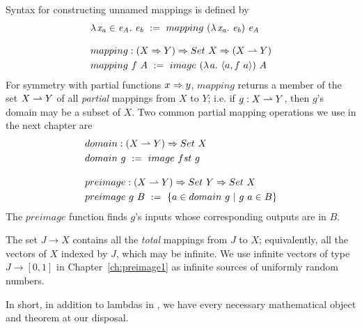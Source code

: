 Syntax for constructing unnamed mappings is defined by
\begin{align}
	&\fun{\mathit{x_a} \in \mathit{e_A}}{\mathit{e_b}} \ :=\ mapping~(\fun{\mathit{x_a}}\mathit{e_b})~\mathit{e_A} \\
\nonumber\\[-0.5\baselineskip]
	&\begin{aligned}
		&mapping : (X \tto Y) \tto Set~X \tto (X \pto Y) \\
		&mapping~f~A \ := \ image~(\fun{a}{\pair{a,f~a}})~A
	\end{aligned}
\end{align}
For symmetry with partial functions $x \Rightarrow y$, $mapping$ returns a member of the set $X \rightharpoonup Y$ of all \emph{partial} mappings from $X$ to $Y$; i.e. if $g : X \rightharpoonup Y$, then $g$'s domain may be a subset of $X$.
Two common partial mapping operations we use in the next chapter are
\begin{align}
	&\begin{aligned}
		&domain : (X \rightharpoonup Y) \Rightarrow Set~X \\
		&domain~g \ := \ image~fst~g
	\end{aligned} \\
\nonumber\\[-0.5\baselineskip]
	&\begin{aligned}
		&preimage : (X \rightharpoonup Y) \Rightarrow Set~Y \Rightarrow Set~X \\
		&preimage~g~B \ :=\ \lbrace {a \in domain~g} \ \lvert\ {g~a \in B} \rbrace
	\end{aligned}
\end{align}
The $preimage$ function finds $g$'s inputs whose corresponding outputs are in $B$.

The set $J \to X$ contains all the \emph{total} mappings from $J$ to $X$; equivalently, all the vectors of $X$ indexed by $J$, which may be infinite.
We use infinite vectors of type $J \to [0,1]$ in Chapter~\ref{ch:preimage1} as infinite sources of uniformly random numbers.

In short, in addition to lambdas in \lzfclang, we have every necessary mathematical object and theorem at our disposal.

